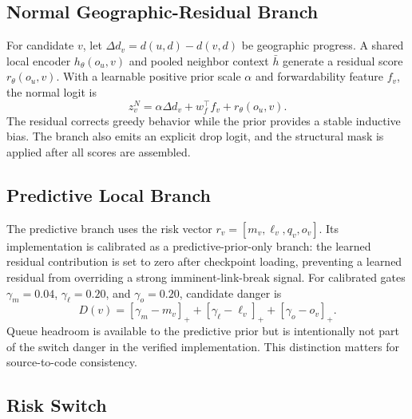 \documentclass[drones,article,submit,moreauthors]{Definitions/mdpi}
\begin{document}
\subsection{Normal Geographic-Residual Branch}

For candidate $v$, let $\Delta d_v=d(u,d)-d(v,d)$ be geographic progress. A shared local encoder $h_\theta(o_u,v)$ and pooled neighbor context $\bar h$ generate a residual score $r_\theta(o_u,v)$. With a learnable positive prior scale $\alpha$ and forwardability feature $f_v$, the normal logit is
\begin{equation}
z^N_v=\alpha\Delta d_v+w_f^\top f_v+r_\theta(o_u,v).
\end{equation}
The residual corrects greedy behavior while the prior provides a stable inductive bias. The branch also emits an explicit drop logit, and the structural mask is applied after all scores are assembled.

\subsection{Predictive Local Branch}

The predictive branch uses the risk vector $r_v=[m_v,\ell_v,q_v,o_v]$. Its implementation is calibrated as a predictive-prior-only branch: the learned residual contribution is set to zero after checkpoint loading, preventing a learned residual from overriding a strong imminent-link-break signal. For calibrated gates $\gamma_m=0.04$, $\gamma_\ell=0.20$, and $\gamma_o=0.20$, candidate danger is
\begin{equation}
D(v)=[\gamma_m-m_v]_+ + [\gamma_\ell-\ell_v]_+ + [\gamma_o-o_v]_+.
\label{eq:danger}
\end{equation}
Queue headroom is available to the predictive prior but is intentionally not part of the switch danger in the verified implementation. This distinction matters for source-to-code consistency.

\subsection{Risk Switch}
\end{document}
